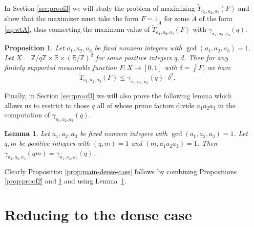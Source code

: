 \documentclass[12pt, notitlepage]{amsart}
\numberwithin{equation}{section}
\def\R{\mathbb R}
\def\Z{\mathbb Z}
\def\wt{\widetilde}
\def\gcd{\operatorname{gcd}}
\newtheorem{lemma}[theorem]{Lemma}
\newtheorem{proposition}[theorem]{Proposition}
\theoremstyle{remark}
\theoremstyle{definition}
\theoremstyle{remark}
\numberwithin{equation}{section}
\begin{document}
In Section \ref{sec:proof3} we will study the problem of maximizing $\wt{T}_{a_1,a_2,a_3}(F)$ and show that the maximizer must take the form $F = 1_{\wt{A}}$ for some $\wt{A}$ of the form \eqref{eq:wtA}, thus connecting the maximum value of $\wt{T}_{a_1,a_2,a_3}(F)$ with $\gamma_{a_1,a_2,a_3}(q)$.

\begin{proposition}\label{prop:proof3}
Let $a_1,a_2,a_3$ be fixed nonzero integers with $\gcd(a_1,a_2,a_3)=1$. Let $X = \Z/q\Z \times \R \times (\R/\Z)^d$ for some positive integers $q,d$. Then for any finitely supported measurable function $F: X \rightarrow [0,1]$ with $\delta = \int F$, we have
$$
\wt{T}_{a_1,a_2,a_3}(F) \leq \gamma_{a_1,a_2,a_3}(q) \cdot \delta^2.
$$
\end{proposition}

Finally, in Section \ref{sec:proof3} we will also prove the following lemma which allows us to restrict to those $q$ all of whose prime factors divide $a_1a_2a_3$ in the computation of $\gamma_{a_1,a_2,a_3}(q)$.

\begin{lemma}\label{lem:q-divide-a1a2a3}
Let $a_1,a_2,a_3$ be fixed nonzero integers with $\gcd(a_1,a_2,a_3)=1$. Let $q,m$ be positive integers with $(q,m)=1$ and $(m,a_1a_2a_3)=1$. Then $\gamma_{a_1,a_2,a_3}(qm) = \gamma_{a_1,a_2,a_3}(q)$.
\end{lemma}

Clearly Proposition \ref{prop:main-dense-case} follows by combining Propositions \ref{prop:proof2} and \ref{prop:proof3} and using Lemma~\ref{lem:q-divide-a1a2a3}.

\section{Reducing to the dense case}\label{sec:proof1}
\end{document}
